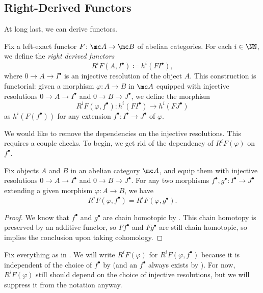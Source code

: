 \documentclass[../notes.tex]{subfiles}
\begin{document}
\subsection{Right-Derived Functors}
At long last, we can derive functors.
\begin{definition} \label{def:rd-func}
	Fix a left-exact functor $F\colon\mc A\to\mc B$ of abelian categories. For each $i\in\NN$, we define the \textit{right derived functors}
	\[R^iF(A,I^\bullet)\coloneqq h^i(FI^\bullet),\]
	where $0\to A\to I^\bullet$ is an injective resolution of the object $A$. This construction is functorial: given a morphism $\varphi\colon A\to B$ in $\mc A$ equipped with injective resolutions $0\to A\to I^\bullet$ and $0\to B\to J^\bullet$, we define the morphism
	\[R^iF(\varphi,f^\bullet)\colon h^i(FI^\bullet)\to h^i(FJ^\bullet)\]
	as $h^i(F(f^\bullet))$ for any extension $f^\bullet\colon I^\bullet\to J^\bullet$ of $\varphi$.
\end{definition}
We would like to remove the dependencies on the injective resolutions. This requires a couple checks. To begin, we get rid of the dependency of $R^iF(\varphi)$ on $f^\bullet$.
\begin{lemma} \label{lem:rd-morphism-uniq}
	Fix objects $A$ and $B$ in an abelian category $\mc A$, and equip them with injective resolutions $0\to A\to I^\bullet$ and $0\to B\to J^\bullet$. For any two morphisms $f^\bullet,g^\bullet\colon I^\bullet\to J^\bullet$ extending a given morphism $\varphi\colon A\to B$, we have
	\[R^iF(\varphi,f^\bullet)=R^iF(\varphi,g^\bullet).\]
\end{lemma}
\begin{proof}
	We know that $f^\bullet$ and $g^\bullet$ are chain homotopic by . This chain homotopy is preserved by an additive functor, so $Ff^\bullet$ and $Fg^\bullet$ are still chain homotopic, so  implies the conclusion upon taking cohomology.
\end{proof}
\begin{notation}
	Fix everything as in . We will write $R^iF(\varphi)$ for $R^iF(\varphi,f^\bullet)$ because it is independent of the choice of $f^\bullet$ by  (and an $f^\bullet$ always exists by ). For now, $R^iF(\varphi)$ still should depend on the choice of injective resolutions, but we will suppress it from the notation anyway.
\end{notation}
\end{document}
